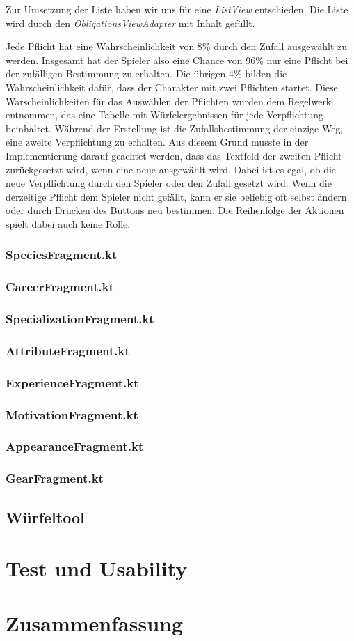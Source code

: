 Zur Umsetzung der Liste haben wir uns für eine \textit{ListView} entschieden. Die Liste wird durch den \textit{ObligationsViewAdapter} mit Inhalt gefüllt.

Jede Pflicht hat eine Wahrscheinlichkeit von 8\% durch den Zufall ausgewählt zu werden. Insgesamt hat der Spieler also eine Chance von 96\% nur eine Pflicht bei der zufälligen Bestimmung zu erhalten. Die übrigen 4\% bilden die Wahrscheinlichkeit dafür, dass der Charakter mit zwei Pflichten startet. Diese Warscheinlichkeiten für das Auswählen der Pflichten wurden dem Regelwerk\cite[39]{rulebook} entnommen, das eine Tabelle mit Würfelergebnissen für jede Verpflichtung beinhaltet. Während der Erstellung ist die Zufallsbestimmung der einzige Weg, eine zweite Verpflichtung zu erhalten. Aus diesem Grund musste in der Implementierung darauf geachtet werden, dass das Textfeld der zweiten Pflicht zurückgesetzt wird, wenn eine neue ausgewählt wird. Dabei ist es egal, ob die neue Verpflichtung durch den Spieler oder den Zufall gesetzt wird. Wenn die derzeitige Pflicht dem Spieler nicht gefällt, kann er sie beliebig oft selbst ändern oder durch Drücken des Buttons neu bestimmen. Die Reihenfolge der Aktionen spielt dabei auch keine Rolle.\\


\subsubsection{SpeciesFragment.kt}
\subsubsection{CareerFragment.kt}
\subsubsection{SpecializationFragment.kt}
\subsubsection{AttributeFragment.kt}
\subsubsection{ExperienceFragment.kt}
\subsubsection{MotivationFragment.kt}
\subsubsection{AppearanceFragment.kt}
\subsubsection{GearFragment.kt}

\subsection{Würfeltool}


\section{Test und Usability}

\section{Zusammenfassung}